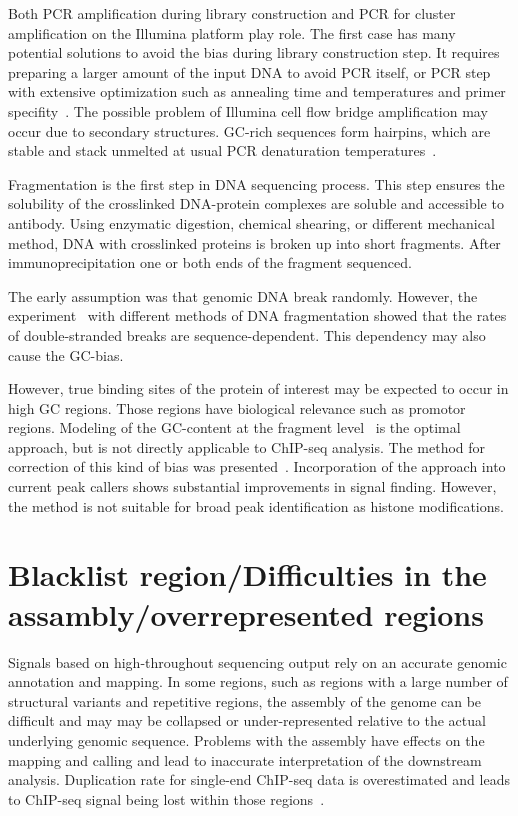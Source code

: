 Both PCR amplification during library construction and PCR for cluster amplification on the Illumina platform play role. 
The first case has many potential solutions to avoid the bias during library construction step.
It requires preparing a larger amount of the input DNA to avoid PCR itself, or PCR step with extensive optimization such as annealing time and temperatures and primer specifity~\cite{aird2011analyzing}.
The possible problem of Illumina cell flow bridge amplification may occur due to secondary structures.
GC-rich sequences form hairpins, which are stable and stack unmelted at usual PCR denaturation temperatures~\cite{stein2010nucleosome}.

Fragmentation is the first step in DNA sequencing process.
This step ensures the solubility of the crosslinked DNA-protein complexes are soluble and accessible to antibody.
Using enzymatic digestion, chemical shearing, or different mechanical method, DNA with crosslinked proteins is broken up into short fragments.
After immunoprecipitation one or both ends of the fragment sequenced.


The early assumption was that genomic DNA break randomly.
However, the experiment~\cite{poptsova2014non} with different methods of DNA fragmentation showed that the rates of double-stranded breaks are sequence-dependent.
This dependency may also cause the GC-bias. 

However, true binding sites of the protein of interest may be expected to occur in high GC regions.
Those regions have biological relevance such as promotor regions.
Modeling of the GC-content at the fragment level~\cite{benjamini2012summarizing} is the optimal approach, but is not directly applicable to ChIP-seq analysis.
The method for correction of this kind of bias was presented~\cite{teng2017accounting}.
Incorporation of the approach into current peak callers shows substantial improvements in signal finding.
However, the method is not suitable for broad peak identification as histone modifications.






\section{Blacklist region/Difficulties in the assambly/overrepresented regions}

Signals based on high-throughout sequencing output rely on an accurate genomic annotation and mapping.
In some regions, such as regions with a large number of structural variants and repetitive regions, the assembly of the genome can be difficult and may may be collapsed or under-represented relative to the actual underlying genomic sequence.
Problems with the assembly have effects on the mapping and calling and lead to inaccurate interpretation of the downstream analysis.
Duplication rate for single-end ChIP-seq data is overestimated and leads to ChIP-seq signal being lost within those regions~\cite{chen2012systematic}.
